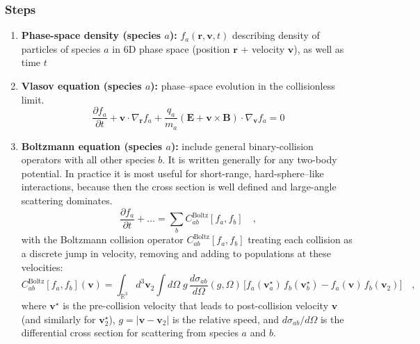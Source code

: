 \documentclass[10pt]{book}
\begin{document}
\subsubsection{Steps}
\begin{enumerate}
  \item \textbf{Phase-space density (species $a$):} $f_a\left(\mathbf{r}, \mathbf{v}, t\right)$ describing density of particles of species $a$ in 6D phase space (position $\mathbf{r}$ + velocity $\mathbf{v}$), as well as time $t$
  \item \textbf{Vlasov equation (species $a$):} phase–space evolution in the collisionless limit.
  \begin{equation}
        \frac{\partial f_a}{\partial t}
        + \mathbf{v} \cdot \nabla_{\mathbf{r}} f_a
        + \frac{q_a}{m_a} \left( \mathbf{E} + \mathbf{v} \times \mathbf{B} \right) \cdot \nabla_{\mathbf{v}} f_a
        = 0
  \end{equation}

  \item \textbf{Boltzmann equation (species $a$):} include general binary-collision operators with all other species $b$.
  It is written generally for any two-body potential.
  In practice it is most useful for short-range, hard-sphere–like interactions, because then the cross section is well defined and large-angle scattering dominates.
  \begin{equation}
    \frac{\partial f_a}{\partial t} + \dots = \sum_b C_{ab}^{\text{Boltz}}[f_a,f_b] \quad ,
  \end{equation}
  with the Boltzmann collision operator $C_{ab}^{\text{Boltz}}[f_a,f_b]$ treating each collision as a discrete jump in velocity, removing and adding to populations at these velocities:
    \begin{equation}
        C^\text{Boltz}_{ab}[f_a,f_b](\mathbf{v}) =
        \int_{\mathbb{R}^3}\! d^3\mathbf{v}_2 \int d\Omega\;
        g\, \frac{d\sigma_{ab}}{d\Omega}(g,\Omega)\,
        \Big[ f_a(\mathbf{v}_a^\star)\,f_b(\mathbf{v}_b^\star) - f_a(\mathbf{v})\,f_b(\mathbf{v}_2) \Big] \quad ,
    \end{equation}
    where $\mathbf{v}^\star$ is the pre-collision velocity that leads to post-collision velocity $\mathbf{v}$ (and similarly for $\mathbf{v}_2^\star$), $g = |\mathbf{v} - \mathbf{v}_2|$ is the relative speed, and $d\sigma_{ab}/d\Omega$ is the differential cross section for scattering from species $a$ and $b$.


\end{enumerate}
\end{document}
